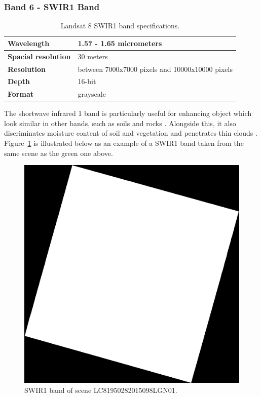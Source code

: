 \documentclass[12pt, a4paper]{report}
\begin{document}
	\subsubsection{Band 6 - SWIR1 Band}
	
	\begin{table} [h]
		\center
		\begin{tabular} {| l | l |}
			\hline
			\textbf{Wavelength} & {1.57 - 1.65 micrometers} \\ [0.2ex]
			\hline
			\textbf{Spacial resolution} & {30 meters} \\ [0.2ex]
			\hline
			\textbf{Resolution} & {between 7000x7000 pixels and 10000x10000 pixels} \\ [0.2ex]
			\hline
			\textbf{Depth} & {16-bit}\\ [0.2ex]
			\hline
			\textbf{Format} & {grayscale}\\ [0.2ex]
			\hline
		\end{tabular}
		\caption{Landsat 8 SWIR1 band specifications.}
		\label{table:swir1_table}
	\end{table}
	\par The shortwave infrared 1 band is particularly useful for enhancing object which look similar in other bands, such as soils and rocks \cite{bd}. Alongside this, it also discriminates moisture content of soil and vegetation and penetrates thin clouds \cite{l8otb}. Figure~\ref{fig:swir1} is illustrated below as an example of a SWIR1 band taken from the same scene as the green one above.
	\begin{figure}[h]
		\centering
		\includegraphics[scale=0.3]{../images/LC81950282015098LGN01_B6.png}
		\caption{SWIR1 band of scene LC81950282015098LGN01.}
		\label{fig:swir1}
	\end{figure}
	
\end{document}
